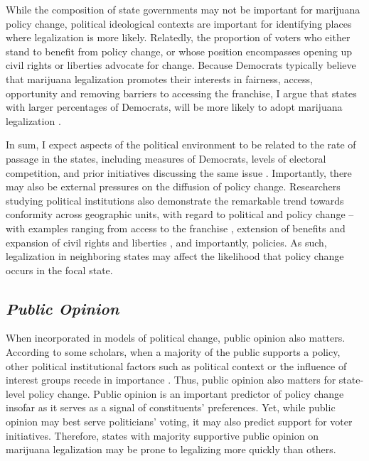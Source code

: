 While the composition of state governments may not be important for marijuana policy change, political ideological contexts are important for identifying places where legalization is more likely. Relatedly, the proportion of voters who either stand to benefit from policy change, or whose position encompasses opening up civil rights or liberties advocate for change. Because Democrats typically believe that marijuana legalization promotes their interests in fairness, access, opportunity and removing barriers to accessing the franchise, I argue that states with larger percentages of Democrats, will be more likely to adopt marijuana legalization \citep{mccammon_et_al_2007,mccammon_et_al_2001,soule_and_olzak_2004}.


In sum, I expect aspects of the political environment to be related to the rate of passage in the states, including measures of Democrats, levels of electoral competition, and prior initiatives discussing the same issue \citep{key_1957,boushey_2016}. Importantly, there may also be external pressures on the diffusion of policy change. Researchers studying political institutions also demonstrate the remarkable trend towards conformity across geographic units, with regard to political and policy change -- with examples ranging from access to the franchise \citep{uggen_and_manza_2002,manza_and_brooks_1999}, extension of benefits \citep{amenta_2006,amenta_et_al_2005} and expansion of civil rights and liberties \citep{andrews_1997}, and importantly, policies. As such, legalization in neighboring states may affect the likelihood that policy change occurs in the focal state. 



\subsection{\it{Public Opinion}}

When incorporated in models of political change, public opinion also matters. According to some scholars, when a majority of the public supports a policy, other political institutional factors such as political context or the influence of interest groups recede in importance \citep{burstein_and_linton_2002,burstein_and_hirsch_2007}. Thus, public opinion also matters for state-level policy change. Public opinion is an important predictor of policy change insofar as it serves as a signal of constituents' preferences. Yet, while public opinion may best serve politicians' voting, it may also predict support for voter initiatives. Therefore, states with majority supportive public opinion on marijuana legalization may be prone to legalizing more quickly than others.


